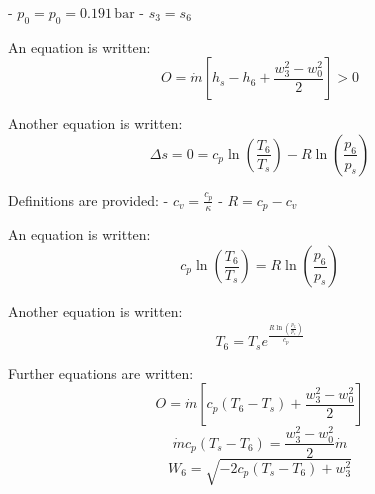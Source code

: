 - \( p_0 = p_0 = 0.191 \, \text{bar} \)  
- \( s_3 = s_6 \)  

An equation is written:  
\[ O = \dot{m} \left[ h_s - h_6 + \frac{w_3^2 - w_0^2}{2} \right] > 0 \]  

Another equation is written:  
\[ \Delta s = 0 = c_p \ln \left( \frac{T_6}{T_s} \right) - R \ln \left( \frac{p_6}{p_s} \right) \]  

Definitions are provided:  
- \( c_v = \frac{c_p}{\kappa} \)  
- \( R = c_p - c_v \)  

An equation is written:  
\[ c_p \ln \left( \frac{T_6}{T_s} \right) = R \ln \left( \frac{p_6}{p_s} \right) \]  

Another equation is written:  
\[ T_6 = T_s e^{\frac{R \ln \left( \frac{p_6}{p_s} \right)}{c_p}} \]  

Further equations are written:  
\[ O = \dot{m} \left[ c_p (T_6 - T_s) + \frac{w_3^2 - w_0^2}{2} \right] \]  
\[ \dot{m} c_p (T_s - T_6) = \frac{w_3^2 - w_0^2}{2} \dot{m} \]  
\[ W_6 = \sqrt{-2 c_p (T_s - T_6) + w_3^2} \]